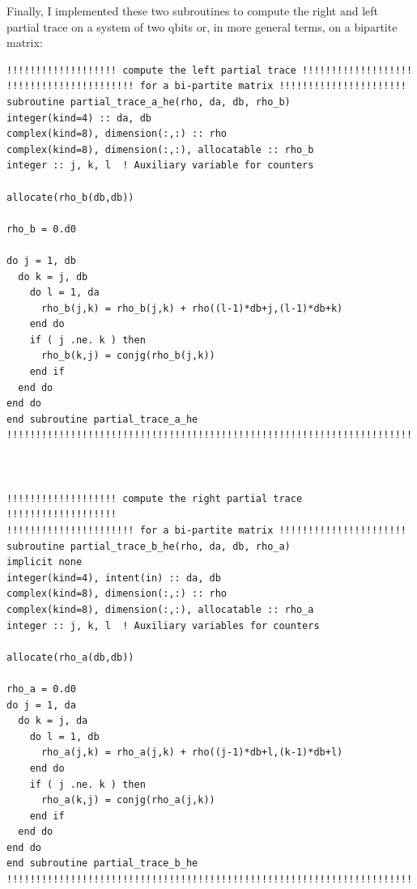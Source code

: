 \documentclass[prb,9pt,notitlepage]{revtex4-1}
\begin{document}
Finally, I implemented these two subroutines to compute the right and left partial trace on a system of two qbits or, in more general terms, on a bipartite matrix:
\begin{lstlisting}
!!!!!!!!!!!!!!!!!!! compute the left partial trace !!!!!!!!!!!!!!!!!!!
!!!!!!!!!!!!!!!!!!!!!! for a bi-partite matrix !!!!!!!!!!!!!!!!!!!!!!
subroutine partial_trace_a_he(rho, da, db, rho_b)
integer(kind=4) :: da, db
complex(kind=8), dimension(:,:) :: rho
complex(kind=8), dimension(:,:), allocatable :: rho_b
integer :: j, k, l  ! Auxiliary variable for counters

allocate(rho_b(db,db))

rho_b = 0.d0

do j = 1, db
  do k = j, db
    do l = 1, da
      rho_b(j,k) = rho_b(j,k) + rho((l-1)*db+j,(l-1)*db+k)
    end do
    if ( j .ne. k ) then
      rho_b(k,j) = conjg(rho_b(j,k))
    end if
  end do
end do
end subroutine partial_trace_a_he
!!!!!!!!!!!!!!!!!!!!!!!!!!!!!!!!!!!!!!!!!!!!!!!!!!!!!!!!!!!!!!!!!!!!!!!!



!!!!!!!!!!!!!!!!!!! compute the right partial trace !!!!!!!!!!!!!!!!!!!
!!!!!!!!!!!!!!!!!!!!!! for a bi-partite matrix !!!!!!!!!!!!!!!!!!!!!!
subroutine partial_trace_b_he(rho, da, db, rho_a)
implicit none
integer(kind=4), intent(in) :: da, db
complex(kind=8), dimension(:,:) :: rho
complex(kind=8), dimension(:,:), allocatable :: rho_a
integer :: j, k, l  ! Auxiliary variables for counters

allocate(rho_a(db,db))

rho_a = 0.d0
do j = 1, da
  do k = j, da
    do l = 1, db
      rho_a(j,k) = rho_a(j,k) + rho((j-1)*db+l,(k-1)*db+l)
    end do
    if ( j .ne. k ) then
      rho_a(k,j) = conjg(rho_a(j,k))
    end if
  end do
end do
end subroutine partial_trace_b_he
!!!!!!!!!!!!!!!!!!!!!!!!!!!!!!!!!!!!!!!!!!!!!!!!!!!!!!!!!!!!!!!!!!!!!!!!
\end{lstlisting}
\end{document}
